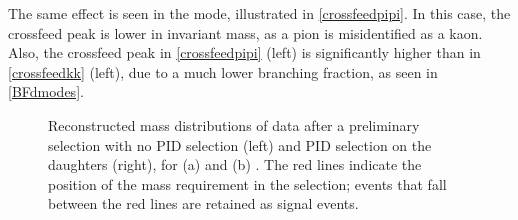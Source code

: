 The same effect is seen in the \pipi mode, illustrated in \fig\ref{crossfeedpipi}. In this case, the crossfeed peak is lower in invariant mass, as a pion is misidentified as a kaon. Also, the crossfeed peak in \fig\ref{crossfeedpipi} (left) is significantly higher than in \fig\ref{crossfeedkk} (left), due to a much lower \decay{\Dz}{\pip\pim} branching fraction, as seen in \tab\ref{BFdmodes}.

\begin{figure}
\hfill
{}
\caption{Reconstructed \Dz mass distributions of data after a preliminary selection with no PID selection (left) and PID selection on the \Dz daughters (right), for (a) \kk and (b) \pipi. The red lines indicate the position of the \Dz mass requirement in the selection; events that fall between the red lines are retained as signal events.}
\label{fig:crossfeed}
\end{figure}

